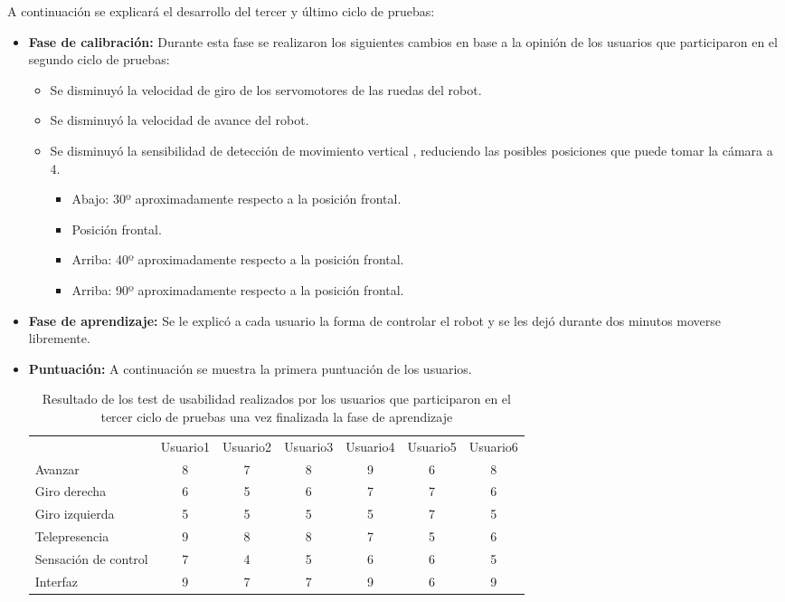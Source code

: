 \documentclass[twoside, 11pt]{epstfg}
\begin{document}
A continuación se explicará el desarrollo del tercer y último ciclo de pruebas:
\begin{itemize}
	\item \textbf{Fase de calibración:} Durante esta fase se realizaron los siguientes cambios en base a la opinión de los usuarios que participaron en el segundo ciclo de pruebas:
	\begin{itemize}
		\item Se disminuyó la velocidad de giro de los servomotores de las ruedas del robot.
		\item Se disminuyó la velocidad de avance del robot.
		\item Se disminuyó la sensibilidad de detección de movimiento vertical , reduciendo las posibles posiciones que puede tomar la cámara a 4.
		\begin{itemize}
			\item Abajo: 30º aproximadamente respecto a la posición frontal.
			\item Posición frontal.
			\item Arriba: 40º aproximadamente respecto a la posición frontal.
			\item Arriba: 90º aproximadamente respecto a la posición frontal.
		\end{itemize}
	\end{itemize}
	\item \textbf{Fase de aprendizaje:} Se le explicó a cada usuario la forma de controlar el robot y se les dejó durante dos minutos moverse libremente.
	\item \textbf{Puntuación: } A continuación se muestra la primera puntuación de los usuarios.
	
\begin{center}

\begin{table}[h!]
\small	

	\begin{tabular}{|g c c c c c c|}
		\hline
		 \\ \hline
		& Usuario1	&Usuario2	&Usuario3	&Usuario4	&Usuario5	&Usuario6 \\
		Avanzar
		 & 8 &7 &8 &9 &6 & 8\\
	Giro derecha
	 & 6 & 5 &6 &7 & 7& 6\\
		Giro izquierda
		 & 5 & 5&5 &5 &7 & 5\\
		Telepresencia
		 & 9 & 8 &8 & 7& 5& 6\\ 
		 Sensación de control
		 & 7 &4 &5 & 6&6 & 5\\
		 		 Interfaz
		 		 & 9 &7 & 7& 9& 6& 9\\
		 \hline
	\end{tabular}
	\caption{Resultado de los test de usabilidad realizados por los usuarios que participaron en el tercer ciclo de pruebas una vez finalizada la fase de aprendizaje}
\end{table}
\end{center}


\end{itemize}
\end{document}
